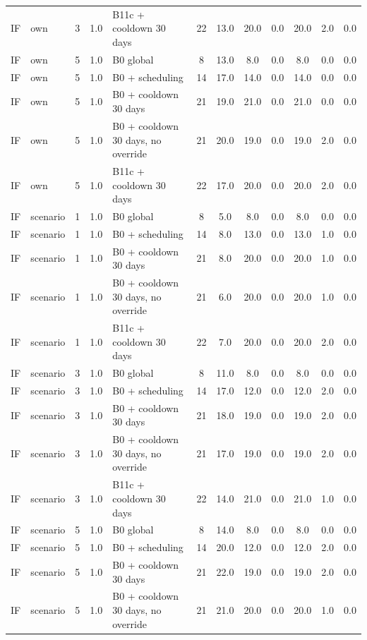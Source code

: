 \documentclass[10pt,onecolumn,letterpaper]{article}
\begin{document}
\begin{longtable}{lllllccccccc}
IF & own & 3 & 1.0 & B11c + cooldown 30 days & 22 & 13.0 & 20.0 & 0.0 & 20.0 & 2.0 & 0.0 \\
IF & own & 5 & 1.0 & B0 global & 8 & 13.0 & 8.0 & 0.0 & 8.0 & 0.0 & 0.0 \\
IF & own & 5 & 1.0 & B0 + scheduling & 14 & 17.0 & 14.0 & 0.0 & 14.0 & 0.0 & 0.0 \\
IF & own & 5 & 1.0 & B0 + cooldown 30 days & 21 & 19.0 & 21.0 & 0.0 & 21.0 & 0.0 & 0.0 \\
IF & own & 5 & 1.0 & B0 + cooldown 30 days, no override & 21 & 20.0 & 19.0 & 0.0 & 19.0 & 2.0 & 0.0 \\
IF & own & 5 & 1.0 & B11c + cooldown 30 days & 22 & 17.0 & 20.0 & 0.0 & 20.0 & 2.0 & 0.0 \\
IF & scenario & 1 & 1.0 & B0 global & 8 & 5.0 & 8.0 & 0.0 & 8.0 & 0.0 & 0.0 \\
IF & scenario & 1 & 1.0 & B0 + scheduling & 14 & 8.0 & 13.0 & 0.0 & 13.0 & 1.0 & 0.0 \\
IF & scenario & 1 & 1.0 & B0 + cooldown 30 days & 21 & 8.0 & 20.0 & 0.0 & 20.0 & 1.0 & 0.0 \\
IF & scenario & 1 & 1.0 & B0 + cooldown 30 days, no override & 21 & 6.0 & 20.0 & 0.0 & 20.0 & 1.0 & 0.0 \\
IF & scenario & 1 & 1.0 & B11c + cooldown 30 days & 22 & 7.0 & 20.0 & 0.0 & 20.0 & 2.0 & 0.0 \\
IF & scenario & 3 & 1.0 & B0 global & 8 & 11.0 & 8.0 & 0.0 & 8.0 & 0.0 & 0.0 \\
IF & scenario & 3 & 1.0 & B0 + scheduling & 14 & 17.0 & 12.0 & 0.0 & 12.0 & 2.0 & 0.0 \\
IF & scenario & 3 & 1.0 & B0 + cooldown 30 days & 21 & 18.0 & 19.0 & 0.0 & 19.0 & 2.0 & 0.0 \\
IF & scenario & 3 & 1.0 & B0 + cooldown 30 days, no override & 21 & 17.0 & 19.0 & 0.0 & 19.0 & 2.0 & 0.0 \\
IF & scenario & 3 & 1.0 & B11c + cooldown 30 days & 22 & 14.0 & 21.0 & 0.0 & 21.0 & 1.0 & 0.0 \\
IF & scenario & 5 & 1.0 & B0 global & 8 & 14.0 & 8.0 & 0.0 & 8.0 & 0.0 & 0.0 \\
IF & scenario & 5 & 1.0 & B0 + scheduling & 14 & 20.0 & 12.0 & 0.0 & 12.0 & 2.0 & 0.0 \\
IF & scenario & 5 & 1.0 & B0 + cooldown 30 days & 21 & 22.0 & 19.0 & 0.0 & 19.0 & 2.0 & 0.0 \\
IF & scenario & 5 & 1.0 & B0 + cooldown 30 days, no override & 21 & 21.0 & 20.0 & 0.0 & 20.0 & 1.0 & 0.0 \\

\end{longtable}
\end{document}
